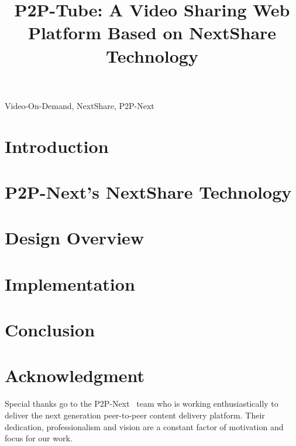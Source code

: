 \documentclass[conference]{IEEEtran}
\begin{document}
\title{P2P-Tube: A Video Sharing Web Platform Based on NextShare Technology}

\author{
}

\maketitle

\begin{abstract}

\end{abstract}


\begin{IEEEkeywords}
Video-On-Demand, NextShare, P2P-Next
\end{IEEEkeywords}


\section{Introduction}
\label{sec:introduction}


\section{P2P-Next's NextShare Technology}
\label{sec:next-share}


\section{Design Overview}
\label{sec:design}


\section{Implementation}
\label{sec:implementation}


\section{Conclusion}
\label{sec:conclusion}


\section*{Acknowledgment}
\label{sec:acknowledgment}

Special thanks go to the P2P-Next~\cite{p2p-next} team who is working
enthusiastically to deliver the next generation peer-to-peer content delivery
platform. Their dedication, professionalism and vision are a constant factor
of motivation and focus for our work.



\end{document}
